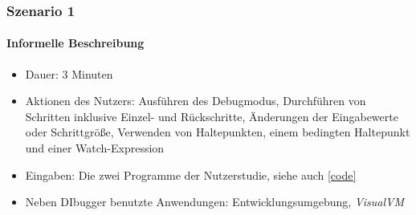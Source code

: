 \documentclass[parskip=full]{scrartcl}
\begin{document}
    \subsubsection{Szenario 1}
        \paragraph{Informelle Beschreibung}
        \begin{itemize}
            \item{Dauer:} 3 Minuten 
            \item{Aktionen des Nutzers:} Ausführen des Debugmodus, Durchführen von Schritten inklusive Einzel- und Rückschritte, Änderungen der Eingabewerte oder Schrittgröße, Verwenden von Haltepunkten, einem bedingten Haltepunkt und einer Watch-Expression
            \item{Eingaben:} Die zwei Programme der Nutzerstudie, siehe auch \ref{code}
            \item{Neben DIbugger benutzte Anwendungen:} Entwicklungsumgebung, \textit{VisualVM}
        \end{itemize}
\end{document}
